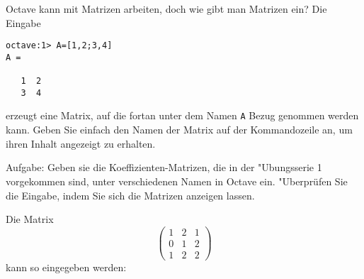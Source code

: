 Octave kann mit Matrizen arbeiten, doch wie gibt man Matrizen ein?
Die Eingabe
\begin{verbatim}
octave:1> A=[1,2;3,4]
A =

   1  2
   3  4
\end{verbatim}
erzeugt eine Matrix, auf die fortan unter dem Namen {\tt A}
Bezug genommen werden kann. Geben Sie einfach den Namen der
Matrix auf der Kommandozeile an, um ihren Inhalt angezeigt zu
erhalten.

Aufgabe: Geben sie die Koeffizienten-Matrizen, die in der "Ubungsserie 1
vorgekommen
sind, unter verschiedenen Namen in Octave ein. "Uberprüfen Sie die
Eingabe, indem Sie sich die Matrizen anzeigen lassen.

\begin{loesung}
Die Matrix
\[
\begin{pmatrix}
1&2&1\\
0&1&2\\
1&2&2
\end{pmatrix}
\]
kann so eingegeben werden:
\end{loesung}


